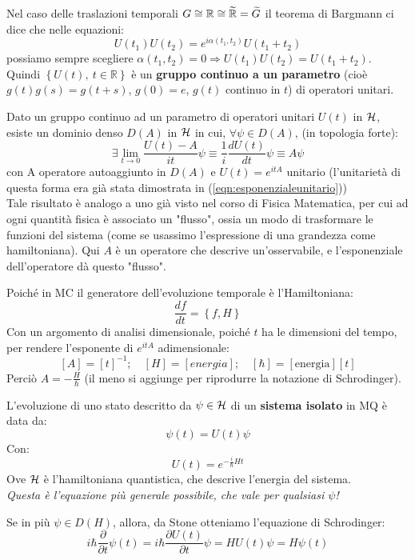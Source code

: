 \documentclass[../../FisicaTeorica.tex]{subfiles}
\begin{document}
Nel caso delle traslazioni temporali $G\cong \mathbb{R}\cong \widetilde{\mathbb{R}}=\widetilde{G}$ il teorema di Bargmann ci dice che nelle equazioni:
\[
U\left(t_1\right)U\left(t_2\right)=e^{i\alpha\left(t_1,t_2\right)}U\left(t_1+t_2\right)
\]
possiamo sempre scegliere $\alpha \left(t_1,t_2\right)=0\Rightarrow U\left(t_1\right)U\left(t_2\right)=U\left(t_1+t_2\right)$.\\
Quindi $\left\{U\left(t\right),\ t\in\mathbb{R}\right\}$ è un \textbf{gruppo continuo a un parametro} (cioè $g\left(t\right)g\left(s\right)=g(t+s)$, $g\left(0\right)=e$, $g(t)$ continuo in $t$) di operatori unitari.

\begin{thm}
Dato un gruppo continuo ad un parametro di operatori unitari $U(t)$ in $\mathcal{H}$, esiste un dominio denso $D\left(A\right)$ in $\mathcal{H}$ in cui, $\forall \psi \in D\left(A\right)$, (in topologia forte):
\[
\exists \lim_{t\rightarrow0}{\frac{U\left(t\right)-A}{it}\psi\equiv}\frac{1}{i}\frac{dU\left(t\right)}{dt}\psi \equiv A\psi
\]
con A operatore autoaggiunto in $D\left(A\right)$ e $U\left(t\right)=e^{itA}$ unitario (l'unitarietà di questa forma era già stata dimostrata in (\ref{eqn:esponenzialeunitario}))\\
Tale risultato è analogo a uno già visto nel corso di Fisica Matematica, per cui ad ogni quantità fisica è associato un "flusso", ossia un modo di trasformare le funzioni del sistema (come se usassimo l'espressione di una grandezza come hamiltoniana). Qui $A$ è un operatore che descrive un'osservabile, e l'esponenziale dell'operatore dà questo "flusso".
\end{thm}
Poiché in MC il generatore dell'evoluzione temporale è l'Hamiltoniana:
\[
\frac{df}{dt}=\left\{f,H\right\}
\]
Con un argomento di analisi dimensionale, poiché $t$ ha le dimensioni del tempo, per rendere l'esponente di $e^{itA}$ adimensionale:
\[
\left[A\right]=\left[t\right]^{-1}; \quad
\left[H\right]=\left[energia\right]; \quad
\left[\hbar\right]=\left[\text{energia}\right]\left[t\right]
\]
Perciò $A=-\frac{H}{\hbar}$ (il meno si aggiunge per riprodurre la notazione di Schrodinger).

\begin{axi}
L'evoluzione di uno stato descritto da $\psi \in \mathcal{H}$ di un \textbf{sistema isolato} in MQ è data da:
\[
\psi \left(t\right)=U\left(t\right)\psi 
\]
Con:
\[
U\left(t\right)=e^{-\frac{i}{\hbar}Ht}
\]
Ove $\mathcal{H}$ è l'hamiltoniana quantistica, che descrive l'energia del sistema.\\
\textit{Questa è l'equazione più generale possibile, che vale per qualsiasi $\psi$!}
\end{axi}
Se in più $\psi \in D(H)$, allora, da Stone otteniamo l'equazione di Schrodinger:
\[
i\hbar \frac{\partial}{\partial t}\psi(t) = i\hbar \frac{\partial U(t)}{\partial t}\psi = HU(t)\psi = H\psi(t) 
\]
\end{document}
